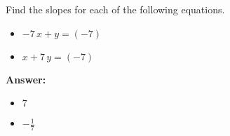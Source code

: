  Find the slopes for each of the following equations. \begin{itemize}\item \( -7 \, x + y = \left(-7\right) \)\item \( x + 7 \, y = \left(-7\right) \)\end{itemize}

        \textbf{Answer:} \begin{itemize}\item \( 7 \)\item \( -\frac{1}{7} \)\end{itemize}
